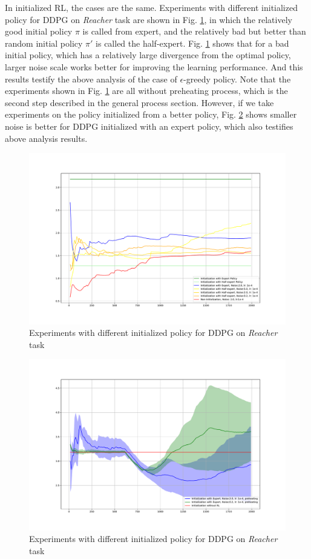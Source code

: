 \documentclass{article}
\begin{document}
In initialized RL, the cases are the same. Experiments with different initialized policy for DDPG on \textit{Reacher} task are shown in Fig. \ref{fig:noise3}, in which the relatively good initial policy $\pi$ is called from expert, and the relatively bad but better than random initial policy $\pi'$ is called the half-expert. Fig. \ref{fig:noise3} shows that for a bad initial policy, which has a relatively large divergence from the optimal policy, larger noise scale works better for improving the learning performance. And this results testify the above analysis of the case of $\epsilon$-greedy policy. Note that the experiments shown in Fig. \ref{fig:noise3} are all without preheating process, which is the second step described in the general process section. However, if we take experiments on the policy initialized from a better policy, Fig. \ref{fig:noise4} shows smaller noise is better for DDPG initialized with an expert policy, which also testifies above analysis results.
\begin{figure}[htbp]
	\centering
	\includegraphics[scale=0.4]{img/ddpg_compare3.pdf}
	\caption{Experiments with different initialized policy for DDPG on \textit{Reacher} task}
	\label{fig:noise3}
\end{figure}

\begin{figure}[htbp]
	\centering
	\includegraphics[scale=0.4]{img/ddpg_compare4.pdf}
	\caption{Experiments with different initialized policy for DDPG on \textit{Reacher} task}
	\label{fig:noise4}
\end{figure}
\end{document}
